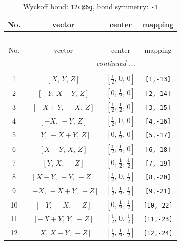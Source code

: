 \documentclass[fleqn,8pt]{jsarticle}
\begin{document}
\begin{longtable}{cccc}
\caption{Wyckoff bond: {\tt 12c@6g}, bond symmetry: {\tt -1}}
 \\
 \hline \hline
No. & vector & center & mapping \\ \hline \endfirsthead

\multicolumn{3}{l}{\tablename\ \thetable{}} \\
 \hline \hline
No. & vector & center & mapping \\ \hline \endhead

 \hline \hline
\multicolumn{3}{r}{\footnotesize\it continued ...} \\ \endfoot

 \hline \hline
\multicolumn{3}{r}{} \\ \endlastfoot

1 & $\left[ X,\, Y,\, Z \right]$ & $\left[ \frac{1}{2},\, 0,\, 0 \right]$ & {\tt [1,-13]} \\ \hline
2 & $\left[ - Y,\, X - Y,\, Z \right]$ & $\left[ 0,\, \frac{1}{2},\, 0 \right]$ & {\tt [2,-14]} \\ \hline
3 & $\left[ - X + Y,\, - X,\, Z \right]$ & $\left[ \frac{1}{2},\, \frac{1}{2},\, 0 \right]$ & {\tt [3,-15]} \\ \hline
4 & $\left[ - X,\, - Y,\, Z \right]$ & $\left[ \frac{1}{2},\, 0,\, 0 \right]$ & {\tt [4,-16]} \\ \hline
5 & $\left[ Y,\, - X + Y,\, Z \right]$ & $\left[ 0,\, \frac{1}{2},\, 0 \right]$ & {\tt [5,-17]} \\ \hline
6 & $\left[ X - Y,\, X,\, Z \right]$ & $\left[ \frac{1}{2},\, \frac{1}{2},\, 0 \right]$ & {\tt [6,-18]} \\ \hline
7 & $\left[ Y,\, X,\, - Z \right]$ & $\left[ 0,\, \frac{1}{2},\, \frac{1}{2} \right]$ & {\tt [7,-19]} \\ \hline
8 & $\left[ X - Y,\, - Y,\, - Z \right]$ & $\left[ \frac{1}{2},\, 0,\, \frac{1}{2} \right]$ & {\tt [8,-20]} \\ \hline
9 & $\left[ - X,\, - X + Y,\, - Z \right]$ & $\left[ \frac{1}{2},\, \frac{1}{2},\, \frac{1}{2} \right]$ & {\tt [9,-21]} \\ \hline
10 & $\left[ - Y,\, - X,\, - Z \right]$ & $\left[ 0,\, \frac{1}{2},\, \frac{1}{2} \right]$ & {\tt [10,-22]} \\ \hline
11 & $\left[ - X + Y,\, Y,\, - Z \right]$ & $\left[ \frac{1}{2},\, 0,\, \frac{1}{2} \right]$ & {\tt [11,-23]} \\ \hline
12 & $\left[ X,\, X - Y,\, - Z \right]$ & $\left[ \frac{1}{2},\, \frac{1}{2},\, \frac{1}{2} \right]$ & {\tt [12,-24]} \\
\end{longtable}
\end{document}
